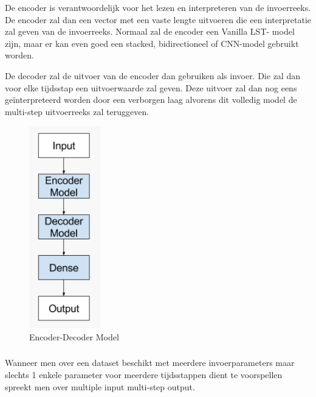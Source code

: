 De encoder is verantwoordelijk voor het lezen en interpreteren van de invoerreeks. De encoder zal dan een vector met een vaste lengte uitvoeren die een interpretatie zal geven van de invoerreeks. Normaal zal de encoder een Vanilla LST- model zijn, maar er kan even goed een stacked, bidirectioneel of CNN-model gebruikt worden.

De decoder zal de uitvoer van de encoder dan gebruiken als invoer. Die zal dan voor elke tijdsstap een uitvoerwaarde zal geven. Deze uitvoer zal dan nog eens ge\"{i}nterpreteerd worden door een verborgen laag alvorens dit volledig model de multi-step uitvoerreeks zal teruggeven.

\begin{figure}
    \centering
    \caption{Encoder-Decoder Model~\autocite{Brownlee2017a}}
    \label{fig:encoder_decoder_lstm}
    \includegraphics[width=0.15\linewidth]{encoder_decoder_lstm}
\end{figure}


\subsubsection{}

\paragraph{}

Wanneer men over een dataset beschikt met meerdere invoerparameters maar slechts 1 enkele parameter voor meerdere tijdsstappen dient te voorspellen spreekt men over multiple input multi-step output.

\paragraph{}

